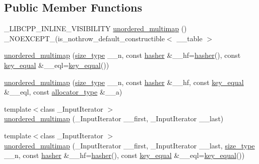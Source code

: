 \subsection*{Public Member Functions}
\begin{DoxyCompactItemize}
\item 
\+\_\+\+L\+I\+B\+C\+P\+P\+\_\+\+I\+N\+L\+I\+N\+E\+\_\+\+V\+I\+S\+I\+B\+I\+L\+I\+T\+Y \hyperlink{classunordered__multimap_aa1f6b416690d0460698d001b15bede02}{unordered\+\_\+multimap} () \+\_\+\+N\+O\+E\+X\+C\+E\+P\+T\+\_\+(is\+\_\+nothrow\+\_\+default\+\_\+constructible$<$ \+\_\+\+\_\+table $>$
\item 
\hyperlink{classunordered__multimap_ad5a1781d30c2d18ba126f2efa19671f1}{unordered\+\_\+multimap} (\hyperlink{classunordered__multimap_a977c4093df6d4d0302f280de19af4b58}{size\+\_\+type} \+\_\+\+\_\+n, const \hyperlink{classunordered__multimap_a93affc33f5ee930cff353ff62d20daef}{hasher} \&\+\_\+\+\_\+hf=\hyperlink{classunordered__multimap_a93affc33f5ee930cff353ff62d20daef}{hasher}(), const \hyperlink{classunordered__multimap_aeed817e3baaf0771b8336eb2477f4f02}{key\+\_\+equal} \&\+\_\+\+\_\+eql=\hyperlink{classunordered__multimap_aeed817e3baaf0771b8336eb2477f4f02}{key\+\_\+equal}())
\item 
\hyperlink{classunordered__multimap_a4df1734040516b3fa505d5ad08404555}{unordered\+\_\+multimap} (\hyperlink{classunordered__multimap_a977c4093df6d4d0302f280de19af4b58}{size\+\_\+type} \+\_\+\+\_\+n, const \hyperlink{classunordered__multimap_a93affc33f5ee930cff353ff62d20daef}{hasher} \&\+\_\+\+\_\+hf, const \hyperlink{classunordered__multimap_aeed817e3baaf0771b8336eb2477f4f02}{key\+\_\+equal} \&\+\_\+\+\_\+eql, const \hyperlink{classunordered__multimap_a821ff3be687cecd9ef325efa93759c19}{allocator\+\_\+type} \&\+\_\+\+\_\+a)
\item 
{\footnotesize template$<$class \+\_\+\+Input\+Iterator $>$ }\\\hyperlink{classunordered__multimap_af7829207aef36c7dd52a7e55780ed86d}{unordered\+\_\+multimap} (\+\_\+\+Input\+Iterator \+\_\+\+\_\+first, \+\_\+\+Input\+Iterator \+\_\+\+\_\+last)
\item 
{\footnotesize template$<$class \+\_\+\+Input\+Iterator $>$ }\\\hyperlink{classunordered__multimap_af00ca614f7641ef62c552540dd846d46}{unordered\+\_\+multimap} (\+\_\+\+Input\+Iterator \+\_\+\+\_\+first, \+\_\+\+Input\+Iterator \+\_\+\+\_\+last, \hyperlink{classunordered__multimap_a977c4093df6d4d0302f280de19af4b58}{size\+\_\+type} \+\_\+\+\_\+n, const \hyperlink{classunordered__multimap_a93affc33f5ee930cff353ff62d20daef}{hasher} \&\+\_\+\+\_\+hf=\hyperlink{classunordered__multimap_a93affc33f5ee930cff353ff62d20daef}{hasher}(), const \hyperlink{classunordered__multimap_aeed817e3baaf0771b8336eb2477f4f02}{key\+\_\+equal} \&\+\_\+\+\_\+eql=\hyperlink{classunordered__multimap_aeed817e3baaf0771b8336eb2477f4f02}{key\+\_\+equal}())

\end{DoxyCompactItemize}
